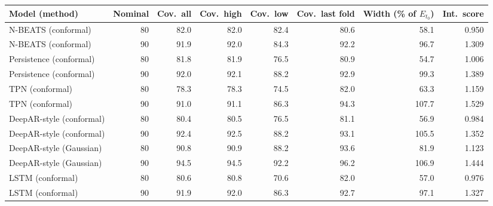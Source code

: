 \begin{tabular}{@{}lrrrrrrr@{}}
\toprule
Model (method) & Nominal & Cov.\ all & Cov.\ high & Cov.\ low & Cov.\ last fold & Width (\% of $E_{t_0}$) & Int.\ score \\
\midrule
N-BEATS (conformal) & 80 & 82.0 & 82.0 & 82.4 & 80.6 & 58.1 & 0.950 \\
N-BEATS (conformal) & 90 & 91.9 & 92.0 & 84.3 & 92.2 & 96.7 & 1.309 \\
Persistence (conformal) & 80 & 81.8 & 81.9 & 76.5 & 80.9 & 54.7 & 1.006 \\
Persistence (conformal) & 90 & 92.0 & 92.1 & 88.2 & 92.9 & 99.3 & 1.389 \\
TPN (conformal) & 80 & 78.3 & 78.3 & 74.5 & 82.0 & 63.3 & 1.159 \\
TPN (conformal) & 90 & 91.0 & 91.1 & 86.3 & 94.3 & 107.7 & 1.529 \\
DeepAR-style (conformal) & 80 & 80.4 & 80.5 & 76.5 & 81.1 & 56.9 & 0.984 \\
DeepAR-style (conformal) & 90 & 92.4 & 92.5 & 88.2 & 93.1 & 105.5 & 1.352 \\
DeepAR-style (Gaussian) & 80 & 90.8 & 90.9 & 88.2 & 93.6 & 81.9 & 1.123 \\
DeepAR-style (Gaussian) & 90 & 94.5 & 94.5 & 92.2 & 96.2 & 106.9 & 1.444 \\
LSTM (conformal) & 80 & 80.6 & 80.8 & 70.6 & 82.0 & 57.0 & 0.976 \\
LSTM (conformal) & 90 & 91.9 & 92.0 & 86.3 & 92.7 & 97.1 & 1.327 \\
\bottomrule
\end{tabular}
